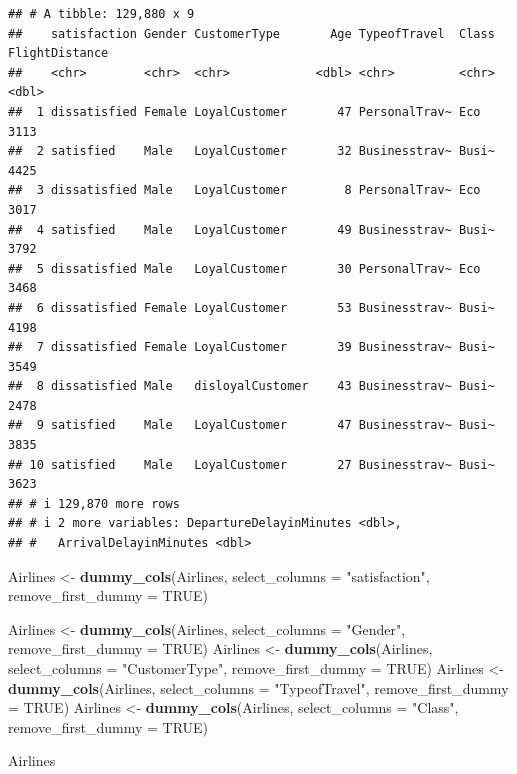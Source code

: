 \documentclass[
]{article}
\newenvironment{Shaded}{\begin{snugshade}}{\end{snugshade}}
\newcommand{\AttributeTok}[1]{\textcolor[rgb]{0.13,0.29,0.53}{#1}}
\newcommand{\ConstantTok}[1]{\textcolor[rgb]{0.56,0.35,0.01}{#1}}
\newcommand{\FunctionTok}[1]{\textcolor[rgb]{0.13,0.29,0.53}{\textbf{#1}}}
\newcommand{\NormalTok}[1]{#1}
\newcommand{\OtherTok}[1]{\textcolor[rgb]{0.56,0.35,0.01}{#1}}
\newcommand{\StringTok}[1]{\textcolor[rgb]{0.31,0.60,0.02}{#1}}
\begin{document}
\begin{verbatim}
## # A tibble: 129,880 x 9
##    satisfaction Gender CustomerType       Age TypeofTravel  Class FlightDistance
##    <chr>        <chr>  <chr>            <dbl> <chr>         <chr>          <dbl>
##  1 dissatisfied Female LoyalCustomer       47 PersonalTrav~ Eco             3113
##  2 satisfied    Male   LoyalCustomer       32 Businesstrav~ Busi~           4425
##  3 dissatisfied Male   LoyalCustomer        8 PersonalTrav~ Eco             3017
##  4 satisfied    Male   LoyalCustomer       49 Businesstrav~ Busi~           3792
##  5 dissatisfied Male   LoyalCustomer       30 PersonalTrav~ Eco             3468
##  6 dissatisfied Female LoyalCustomer       53 Businesstrav~ Busi~           4198
##  7 dissatisfied Female LoyalCustomer       39 Businesstrav~ Busi~           3549
##  8 dissatisfied Male   disloyalCustomer    43 Businesstrav~ Busi~           2478
##  9 satisfied    Male   LoyalCustomer       47 Businesstrav~ Busi~           3835
## 10 satisfied    Male   LoyalCustomer       27 Businesstrav~ Busi~           3623
## # i 129,870 more rows
## # i 2 more variables: DepartureDelayinMinutes <dbl>,
## #   ArrivalDelayinMinutes <dbl>
\end{verbatim}

\begin{Shaded}
\begin{Highlighting}[]
\NormalTok{Airlines }\OtherTok{\textless{}{-}} \FunctionTok{dummy\_cols}\NormalTok{(Airlines, }\AttributeTok{select\_columns =} \StringTok{"satisfaction"}\NormalTok{, }\AttributeTok{remove\_first\_dummy =} \ConstantTok{TRUE}\NormalTok{)}

\NormalTok{Airlines }\OtherTok{\textless{}{-}} \FunctionTok{dummy\_cols}\NormalTok{(Airlines, }\AttributeTok{select\_columns =} \StringTok{"Gender"}\NormalTok{, }\AttributeTok{remove\_first\_dummy =} \ConstantTok{TRUE}\NormalTok{)}
\NormalTok{Airlines }\OtherTok{\textless{}{-}} \FunctionTok{dummy\_cols}\NormalTok{(Airlines, }\AttributeTok{select\_columns =} \StringTok{"CustomerType"}\NormalTok{, }\AttributeTok{remove\_first\_dummy =} \ConstantTok{TRUE}\NormalTok{)}
\NormalTok{Airlines }\OtherTok{\textless{}{-}} \FunctionTok{dummy\_cols}\NormalTok{(Airlines, }\AttributeTok{select\_columns =} \StringTok{"TypeofTravel"}\NormalTok{, }\AttributeTok{remove\_first\_dummy =} \ConstantTok{TRUE}\NormalTok{)}
\NormalTok{Airlines }\OtherTok{\textless{}{-}} \FunctionTok{dummy\_cols}\NormalTok{(Airlines, }\AttributeTok{select\_columns =} \StringTok{"Class"}\NormalTok{, }\AttributeTok{remove\_first\_dummy =} \ConstantTok{TRUE}\NormalTok{)}

\NormalTok{Airlines}
\end{Highlighting}
\end{Shaded}
\end{document}
